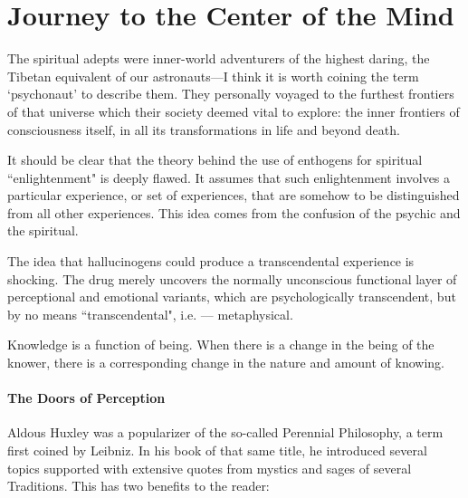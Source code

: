 \section{Journey to the Center of the Mind}

\begin{quotex}
The spiritual adepts were inner-world adventurers of the highest daring, the Tibetan equivalent of our astronauts—I think it is worth coining the term `psychonaut' to describe them. They personally voyaged to the furthest frontiers of that universe which their society deemed vital to explore: the inner frontiers of consciousness itself, in all its transformations in life and beyond death. 

It should be clear that the theory behind the use of enthogens for spiritual ``enlightenment" is deeply flawed. It assumes that such enlightenment involves a particular experience, or set of experiences, that are somehow to be distinguished from all other experiences. This idea comes from the confusion of the psychic and the spiritual. 

The idea that hallucinogens could produce a transcendental experience is shocking. The drug merely uncovers the normally unconscious functional layer of perceptional and emotional variants, which are psychologically transcendent, but by no means ``transcendental", i.e. — metaphysical. 

Knowledge is a function of being. When there is a change in the being of the knower, there is a corresponding change in the nature and amount of knowing. 

\end{quotex}

\paragraph{The Doors of Perception}

Aldous Huxley was a popularizer of the so-called Perennial Philosophy, a term first coined by Leibniz. In his book of that same title, he introduced several topics supported with extensive quotes from mystics and sages of several Traditions. This has two benefits to the reader:

